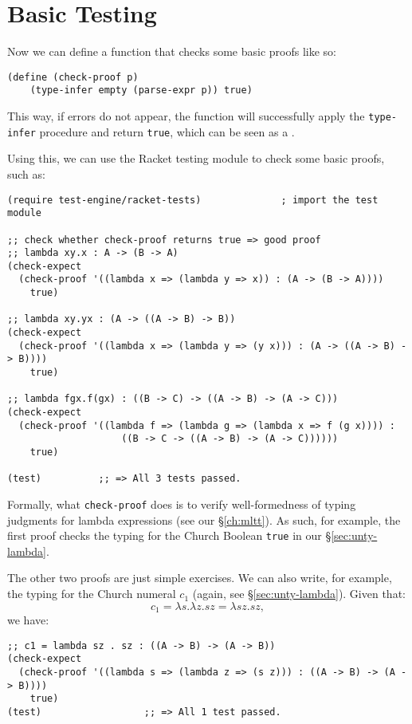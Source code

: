 \section{Basic Testing}

Now we can define a function that checks some basic proofs like so:
{
  \small
\begin{verbatim}
(define (check-proof p)
    (type-infer empty (parse-expr p)) true)
\end{verbatim}
}

This way, if errors do not appear, the function will successfully apply
the \texttt{type-infer} procedure and return \texttt{true}, which can be
seen as a .

Using this, we can use the Racket testing module to check some basic
proofs, such as:
{
  \small
\begin{verbatim}
(require test-engine/racket-tests)              ; import the test module

;; check whether check-proof returns true => good proof
;; lambda xy.x : A -> (B -> A)
(check-expect
  (check-proof '((lambda x => (lambda y => x)) : (A -> (B -> A))))
    true)

;; lambda xy.yx : (A -> ((A -> B) -> B))
(check-expect
  (check-proof '((lambda x => (lambda y => (y x))) : (A -> ((A -> B) -> B))))
    true)

;; lambda fgx.f(gx) : ((B -> C) -> ((A -> B) -> (A -> C)))
(check-expect
  (check-proof '((lambda f => (lambda g => (lambda x => f (g x)))) :
                    ((B -> C -> ((A -> B) -> (A -> C))))))
    true)

(test)          ;; => All 3 tests passed.
\end{verbatim}
}

\vspace{0.3cm}

Formally, what \texttt{check-proof} does is to verify well-formedness of
typing judgments for lambda expressions (see our \S\ref{ch:mltt}). As such,
for example, the first proof checks the typing for the Church Boolean
\texttt{true} in our \S\ref{sec:unty-lambda}.

The other two proofs are just simple exercises. We can also write, for example,
the typing for the Church numeral $ c_1 $ (again, see \S\ref{sec:unty-lambda}).
Given that:
\[
  c_1 = \lambda s . \lambda z . sz = \lambda sz.sz,
\]
we have:
{
  \small
\begin{verbatim}
;; c1 = lambda sz . sz : ((A -> B) -> (A -> B))
(check-expect
  (check-proof '((lambda s => (lambda z => (s z))) : ((A -> B) -> (A -> B))))
    true)
(test)                  ;; => All 1 test passed.
\end{verbatim}
}




